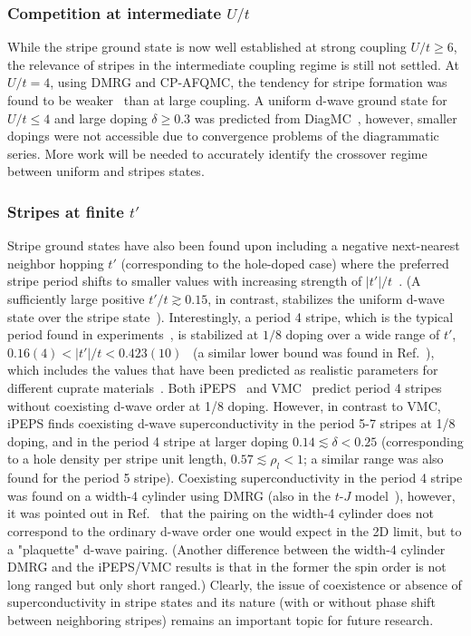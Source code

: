 \documentclass{ar-1col}
\begin{document}
\subsubsection{Competition at intermediate $U/t$}
While the stripe ground state is now well established at strong coupling $U/t\ge6$, the relevance of stripes in the intermediate coupling regime is still not settled. At $U/t=4$, using DMRG and CP-AFQMC, the tendency for stripe formation was found to be weaker~\cite{Qin20} than at large coupling. A uniform d-wave ground state for $U/t\le4$ and large doping $\delta\ge0.3$ was predicted from DiagMC~\cite{Deng15,Simkovic19}, however, smaller dopings were not accessible due to convergence problems of the diagrammatic series. More work will be needed to accurately identify the crossover regime between uniform and stripes states.

\subsubsection{Stripes at finite $t'$}
Stripe ground states have also been found upon including a negative next-nearest neighbor hopping $t'$ (corresponding to the hole-doped case) where the preferred stripe period shifts to smaller values with increasing strength of $|t'|/t$~\cite{Ido18,Huang18,Ponsioen19,Jiang19,Jiang20}. (A sufficiently large positive $t'/t \gtrsim 0.15$, in contrast, stabilizes the uniform d-wave state over the stripe state~\cite{Huang18,Ponsioen19}). 
Interestingly, a period 4 stripe, which is the typical  period found in experiments~\cite{Tranquada95}, is stabilized at $1/8$ doping over a wide range of $t'$, $0.16(4) < |t'|/t < 0.423(10)$~\cite{Ponsioen19} (a similar lower bound was found in Ref.~\cite{Ido18}), which includes the values that have been predicted as realistic parameters for different cuprate materials~\cite{Andersen95,Hirayama18,Hirayama19}. 
%
Both iPEPS~\cite{Ponsioen19} and VMC~\cite{Ido18} predict period 4 stripes without coexisting d-wave order at 1/8 doping. However, in contrast to VMC, iPEPS finds coexisting d-wave superconductivity in the period 5-7 stripes at 1/8 doping, and in the period 4 stripe at larger doping $0.14 \lesssim \delta  < 0.25$ (corresponding to a hole density per stripe unit length, $0.57 \lesssim \rho_l <1$; a similar range was also found for the period 5 stripe). 
%
Coexisting superconductivity in the period 4 stripe was found on a width-4 cylinder using DMRG \cite{Jiang19,Jiang20,Chung20} (also in the $t$-$J$ model~\cite{Dodaro17,Jiang18}), however, it was pointed out in Ref.~\cite{Chung20} that the pairing on the width-4 cylinder does not correspond to the ordinary d-wave order one would expect in the 2D limit, but to a "plaquette" d-wave pairing.  (Another difference between the width-4 cylinder DMRG and the iPEPS/VMC results is that in the former the spin order is not long ranged but only short ranged.) Clearly, the issue of coexistence or absence of superconductivity in stripe states and its nature (with or without phase shift between neighboring stripes) remains an important topic for future research.
\end{document}
